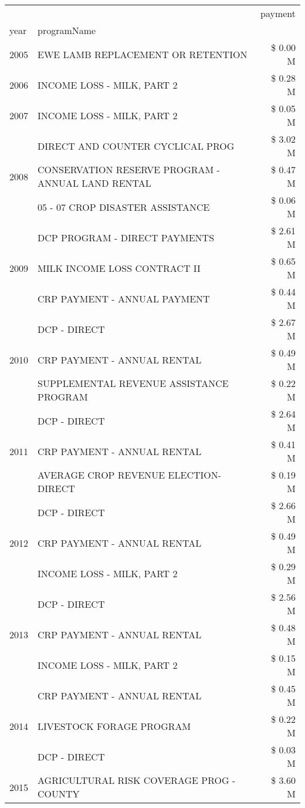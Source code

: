 \begin{tabular}{llr}
\toprule
 &  & payment \\
year & programName &  \\
\midrule
2005 & EWE LAMB REPLACEMENT OR RETENTION & \$ 0.00 M \\
\cline{1-3}
2006 & INCOME LOSS - MILK, PART 2 & \$ 0.28 M \\
\cline{1-3}
2007 & INCOME LOSS - MILK, PART 2 & \$ 0.05 M \\
\cline{1-3}
\multirow[t]{3}{*}{2008} & DIRECT AND COUNTER CYCLICAL PROG & \$ 3.02 M \\
 & CONSERVATION RESERVE PROGRAM - ANNUAL LAND RENTAL & \$ 0.47 M \\
 & 05 - 07 CROP DISASTER ASSISTANCE & \$ 0.06 M \\
\cline{1-3}
\multirow[t]{3}{*}{2009} & DCP PROGRAM - DIRECT PAYMENTS & \$ 2.61 M \\
 & MILK INCOME LOSS CONTRACT II & \$ 0.65 M \\
 & CRP PAYMENT - ANNUAL PAYMENT & \$ 0.44 M \\
\cline{1-3}
\multirow[t]{3}{*}{2010} & DCP - DIRECT & \$ 2.67 M \\
 & CRP PAYMENT - ANNUAL RENTAL & \$ 0.49 M \\
 & SUPPLEMENTAL REVENUE ASSISTANCE PROGRAM & \$ 0.22 M \\
\cline{1-3}
\multirow[t]{3}{*}{2011} & DCP - DIRECT & \$ 2.64 M \\
 & CRP PAYMENT - ANNUAL RENTAL & \$ 0.41 M \\
 & AVERAGE CROP REVENUE ELECTION-DIRECT & \$ 0.19 M \\
\cline{1-3}
\multirow[t]{3}{*}{2012} & DCP - DIRECT & \$ 2.66 M \\
 & CRP PAYMENT - ANNUAL RENTAL & \$ 0.49 M \\
 & INCOME LOSS - MILK, PART 2 & \$ 0.29 M \\
\cline{1-3}
\multirow[t]{3}{*}{2013} & DCP - DIRECT & \$ 2.56 M \\
 & CRP PAYMENT - ANNUAL RENTAL & \$ 0.48 M \\
 & INCOME LOSS - MILK, PART 2 & \$ 0.15 M \\
\cline{1-3}
\multirow[t]{3}{*}{2014} & CRP PAYMENT - ANNUAL RENTAL & \$ 0.45 M \\
 & LIVESTOCK FORAGE PROGRAM & \$ 0.22 M \\
 & DCP - DIRECT & \$ 0.03 M \\
\cline{1-3}
\multirow[t]{3}{*}{2015} & AGRICULTURAL RISK COVERAGE PROG - COUNTY & \$ 3.60 M \\

\end{tabular}
